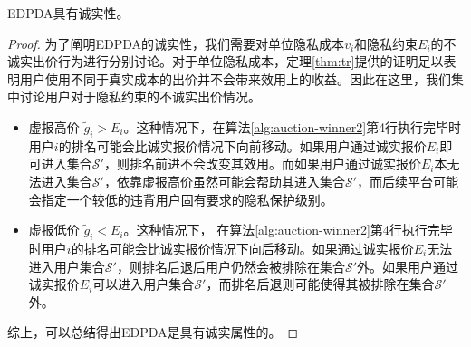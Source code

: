 	
	\begin{thm}
		EDPDA具有诚实性。
	\end{thm} 
	\begin{proof}
		为了阐明EDPDA的诚实性，我们需要对单位隐私成本$v_i$和隐私约束$E_i$的不诚实出价行为进行分别讨论。对于单位隐私成本，定理\ref{thm:tr}提供的证明足以表明用户使用不同于真实成本的出价并不会带来效用上的收益。因此在这里，我们集中讨论用户对于隐私约束的不诚实出价情况。
		\begin{itemize}
			\item 虚报高价 $\tilde{g}_i>E_i$。这种情况下，在算法\ref{alg:auction-winner2}第4行执行完毕时用户$i$的排名可能会比诚实报价情况下向前移动。如果用户通过诚实报价$E_i$即可进入集合$\mathcal{S}'$，则排名前进不会改变其效用。而如果用户通过诚实报价$E_i$本无法进入集合$\mathcal{S}'$，依靠虚报高价虽然可能会帮助其进入集合$\mathcal{S}'$，而后续平台可能会指定一个较低的违背用户固有要求的隐私保护级别。		
			\item 虚报低价 $\tilde{g}_i<E_i$。这种情况下， 在算法\ref{alg:auction-winner2}第4行执行完毕时用户$i$的排名可能会比诚实报价情况下向后移动。如果通过诚实报价$E_i$无法进入用户集合$\mathcal{S}'$，则排名后退后用户仍然会被排除在集合$\mathcal{S}'$外。如果用户通过诚实报价$E_i$可以进入用户集合$\mathcal{S}'$，而排名后退则可能使得其被排除在集合$\mathcal{S}'$外。
		\end{itemize}
		综上，可以总结得出EDPDA是具有诚实属性的。
	\end{proof}
